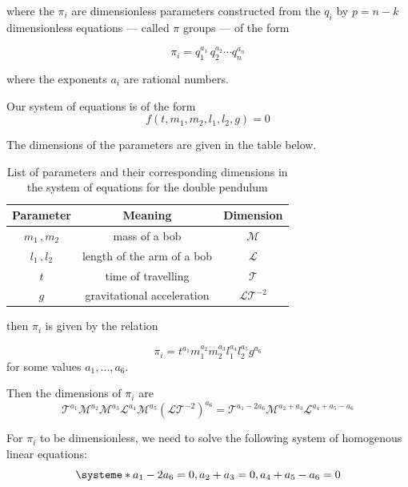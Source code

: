 \documentclass{article}
\begin{document}
where the $\pi_i$ are dimensionless parameters constructed from the $q_i$ by $p = n-k$ dimensionless equations — called $\pi$ groups — of the form

\begin{equation}
\pi_i=q_1^{a_1}\,q_2^{a_2}\cdots q_n^{a_n}
\end{equation}

where the exponents $a_i$ are rational numbers.

Our system of equations is of the form
\begin{equation}
f(t, m_1, m_2, l_1, l_2, g) = 0 
\end{equation}

The dimensions of the parameters are given in the table below.

\begin{table}[!hbtp]
\centering

\begin{tabular}{|c|c|c|}
\hline
Parameter & Meaning & Dimension \\ \hline
     $m_1\,, m_2$     & mass of a bob      &   $\mathcal{M}$        \\ \hline
     $l_1\,,l_2$     & length of the arm of a bob       &     $\mathcal{L}$      \\ \hline
     $t$    & time of travelling        &     $\mathcal{T}$      \\ \hline
     $g$     & gravitational acceleration        &    $\mathcal{LT}^{-2}$       \\ \hline
\end{tabular}
\caption{List of parameters and their corresponding dimensions in the system of equations for the double pendulum}
\end{table}

then $\pi_i$ is given by the relation

\begin{equation}
\pi_i = t^{a_1}m_1^{a_2}m_2^{a_3}l_1^{a_4}l_2^{a_5}g^{a_6}
\end{equation}
for some values $a_1, \ldots, a_6$.

Then the dimensions of $\pi_i$ are
\begin{equation}
\mathcal{T}^{a_1}\mathcal{M}^{a_2}\mathcal{M}^{a_3}\mathcal{L}^{a_4}\mathcal{M}^{a_5}(\mathcal{LT}^{-2})^{a_6} = \mathcal{T}^{a_1 - 2a_6}\mathcal{M}^{a_2+a_3}\mathcal{L}^{a_4+a_5-a_6}
\end{equation}

For $\pi_i$ to be dimensionless, we need to solve the following system of homogenous linear equations:
\begin{equation}
\systeme*{a_1 - 2a_6 = 0, a_2 + a_3 = 0, a_4 + a_5 - a_6 = 0}
\end{equation}
\end{document}
